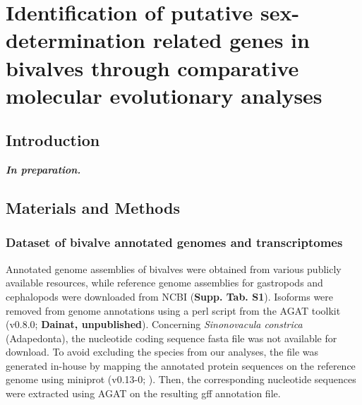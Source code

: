 \documentclass[../main.tex]{subfiles}
\begin{document}
{
\chapter{Identification of putative sex-determination related genes in bivalves through comparative molecular evolutionary analyses}
\label{molecularEvolution}


\vspace{5mm}




\vspace{5mm}

}

\newpage

\section{Introduction} \label{chapter3_introduction}

\textbf{\textit{In preparation.}}

\section{Materials and Methods} \label{chpater3_MM}
\subsection{Dataset of bivalve annotated genomes and transcriptomes}
Annotated genome assemblies of bivalves were obtained from various publicly available resources, while reference genome assemblies for gastropods and cephalopods were downloaded from NCBI (\textbf{Supp. Tab. S1}). Isoforms were removed from genome annotations using a perl script from the AGAT toolkit (v0.8.0; \textbf{Dainat, unpublished}). Concerning \textit{Sinonovacula constrica} (Adapedonta), the nucleotide coding sequence fasta file was not available for download. To avoid excluding the species from our analyses, the file was generated in-house by mapping the annotated protein sequences on the reference genome using miniprot (v0.13-0; \textbf{\cite{li2023miniprot}}). Then, the corresponding nucleotide sequences were extracted using AGAT on the resulting gff annotation file.
\end{document}
